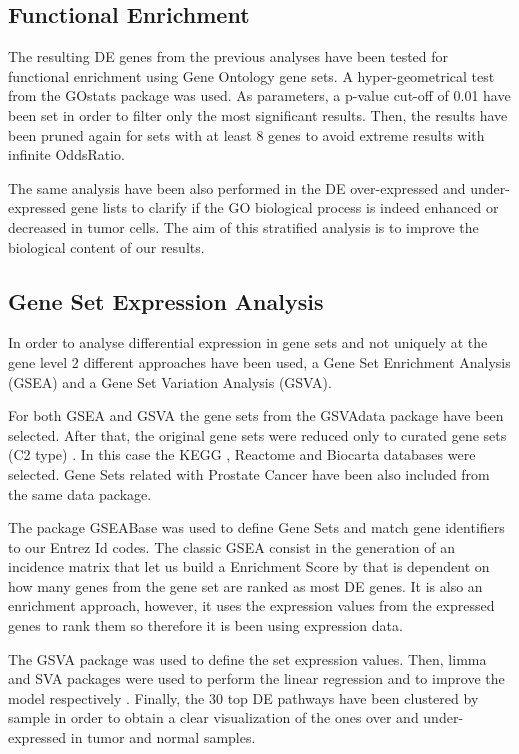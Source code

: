\documentclass[9pt,twocolumn,twoside]{gsajnl}
\begin{document}
\subsection*{Functional Enrichment}

The resulting DE genes from the previous analyses have been tested for functional enrichment using Gene Ontology gene sets. A hyper-geometrical test from the GOstats package \cite{GOstats} was used. As parameters, a p-value cut-off of 0.01 have been set in order to filter only the most significant results. Then, the results have been pruned again for sets with at least 8 genes to avoid extreme results with infinite OddsRatio.

The same analysis have been also performed in the DE over-expressed and under-expressed gene lists to clarify if the GO biological process is indeed enhanced or decreased in tumor cells. The aim of this stratified analysis is to improve the biological content of our results.


\subsection*{Gene Set Expression Analysis}
In order to analyse differential expression in gene sets and not uniquely at the gene level 2 different approaches have been used, a Gene Set Enrichment Analysis (GSEA) and a Gene Set Variation Analysis (GSVA).


For both GSEA and GSVA the gene sets from the GSVAdata package \cite{GSVAdata} have been selected. After that, the original gene sets were reduced only to curated gene sets  (C2 type) . In this case the KEGG  \cite{kanehisa2016kegg}, Reactome \cite{fabregat2016reactome} and   Biocarta \cite{nishimura2001biocarta} databases were selected. Gene Sets related with Prostate Cancer have been also included from the same data package.


The package GSEABase \cite{GSEABase} was used to define Gene Sets and match gene identifiers to our Entrez Id codes. The classic GSEA consist in the generation of an incidence matrix that let us build a Enrichment Score by that is dependent on how many genes from the gene set are ranked as most DE genes. It is also an enrichment approach, however, it uses the expression values from the expressed genes to rank them so therefore it is been using expression data.

The GSVA package \cite{GSVA} was used to define the set expression values. Then, limma  \cite{limma} and SVA packages were used to perform the linear regression and to improve the model respectively \cite{leek2007capturing,svamanual} . Finally, the 30 top DE pathways have been clustered by sample in order to obtain a clear visualization of the ones over and under-expressed in tumor and normal samples.
\end{document}
